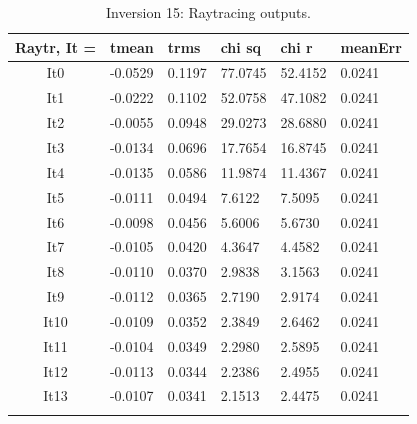 \documentclass[fontsize=11pt, %
                             paper=a4, %
                             twoside, %
                             captions=tableheading,
                             index=totoc,
                             hyperref]{labbook}
\begin{document}
\begin{addmargin}[4cm]{0cm}
\begin{table}[!ht]
\label{tab:r15}
\raggedleft
\begin{tabular}{c l l l l l}
\toprule
\textbf{Raytr, It = } & \textbf{tmean} & \textbf{trms} & \textbf{chi sq} & \textbf{chi r} & \textbf{meanErr} \\
\toprule
It0 & -0.0529 & 0.1197 & 77.0745 & 52.4152 & 0.0241\\
It1 & -0.0222 & 0.1102 & 52.0758 & 47.1082 & 0.0241\\
It2 & -0.0055 & 0.0948 & 29.0273 & 28.6880 & 0.0241\\
It3 & -0.0134 & 0.0696 & 17.7654 & 16.8745 & 0.0241\\
It4 & -0.0135 & 0.0586 & 11.9874 & 11.4367 & 0.0241\\
It5 & -0.0111 & 0.0494 & 7.6122 & 7.5095 & 0.0241\\
It6 & -0.0098 & 0.0456 & 5.6006 & 5.6730 & 0.0241\\
It7 & -0.0105 & 0.0420 & 4.3647 & 4.4582 & 0.0241\\
It8 & -0.0110 & 0.0370 & 2.9838 & 3.1563 & 0.0241\\
It9 & -0.0112 & 0.0365 & 2.7190 & 2.9174 & 0.0241\\
It10 & -0.0109 & 0.0352 & 2.3849 & 2.6462 & 0.0241\\
It11 & -0.0104 & 0.0349 & 2.2980 & 2.5895 & 0.0241\\
It12 & -0.0113 & 0.0344 & 2.2386 & 2.4955 & 0.0241\\
It13 & -0.0107 & 0.0341 & 2.1513 & 2.4475 & 0.0241\\
\bottomrule\\
\end{tabular}
\caption{Inversion 15: Raytracing outputs.}
\end{table}


\end{addmargin}
\end{document}
